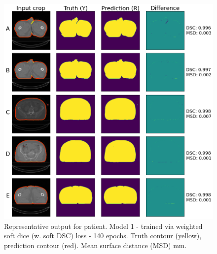 \begin{figure}[H]
	\begin{center}
		\includegraphics[width=1.0\textwidth]{figures/prostate_patient}
		\caption{Representative output for patient. Model 1 - trained via weighted
      soft dice (w. soft DSC) loss - 140 epochs.  Truth contour (yellow),
      prediction contour (red). Mean surface distance (MSD) mm.}
		\label{fig:prostate_patient}
	\end{center}
\end{figure}



